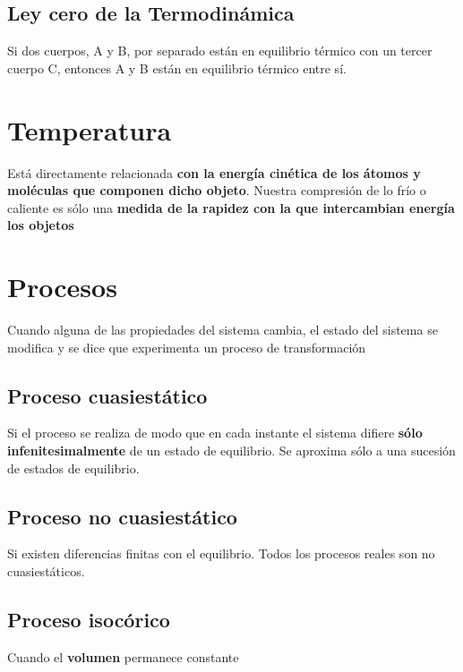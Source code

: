 \documentclass[12pt,twocolumn,a4paper]{report}
\begin{document}
\subsection*{Ley cero de la Termodinámica}
Si dos cuerpos, A y B, por separado están en equilibrio térmico con un tercer cuerpo C, entonces A y B están en equilibrio térmico entre sí. 


\section*{Temperatura}
Está directamente relacionada \textbf{con la energía cinética de los átomos y moléculas que componen dicho objeto}. Nuestra compresión de lo frío o caliente es sólo una \textbf{medida de la rapidez con la que intercambian energía los objetos}

\section*{Procesos}
Cuando alguna de las propiedades del sistema cambia, el estado del sistema se modifica y se dice que experimenta un proceso de transformación

\subsection*{Proceso cuasiestático}
Si el proceso se realiza de modo que en cada instante el sistema difiere \textbf{sólo infenitesimalmente} de un estado de equilibrio. Se aproxima sólo a una sucesión de estados de equilibrio.

\subsection*{Proceso no cuasiestático}
Si existen diferencias finitas con el equilibrio. Todos los procesos reales son no cuasiestáticos.

\subsection*{Proceso isocórico}
Cuando el \textbf{volumen} permanece constante
\end{document}
